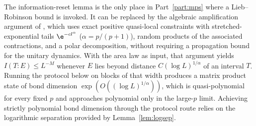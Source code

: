 \begin{remark}\label{rem:LRfree}
The information-reset lemma is the only place in Part~\ref{part:mps} where a
Lieb--Robinson bound is invoked. It can be replaced by the algebraic amplification
argument of \cite[Section~10]{AL}, which uses exact positive quasi-local
constraints with stretched-exponential tails $\e^{-cl^\alpha}$
($\alpha=p/(p+1)$), random products of the associated contractions, and a
polar decomposition, without requiring a propagation bound for the unitary
dynamics. With the area law as input, that argument yields
$I(T:E)\le L^{-M}$ whenever $E$ lies beyond distance $C(\log L)^{1/\alpha}$ of an
interval $T$. Running the protocol below on blocks of that width produces
a matrix product state of bond dimension $\exp(O((\log L)^{1/\alpha}))$, which is
quasi-polynomial for every fixed $p$ and approaches polynomial only in the large-$p$ limit.
Achieving strictly polynomial bond dimension through the protocol route relies on the
logarithmic separation provided by Lemma~\ref{lem:logsep}.
\end{remark}
